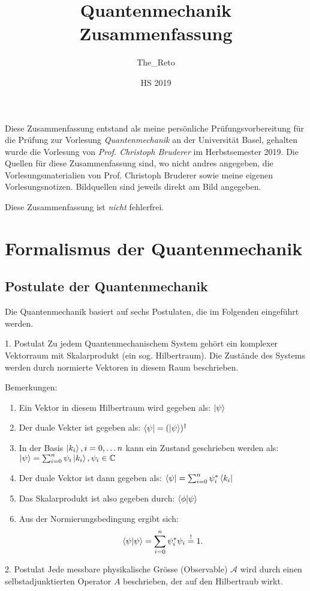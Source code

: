 \documentclass{report}
\title{ Quantenmechanik \\
        \large Zusammenfassung
        }
\author{The\_Reto}
\date{HS 2019}
\begin{document}
    \maketitle
    Diese Zusammenfassung entstand als meine persönliche Prüfungsvorbereitung für die Prüfung zur Vorlesung \emph{Quantenmechanik} an der Universität Basel, gehalten wurde die Vorlesung von \emph{Prof. Christoph Bruderer} im Herbstsemester 2019. Die Quellen für diese Zusammenfassung sind, wo nicht andres angegeben, die Vorlesungsmaterialien von Prof. Christoph Bruderer sowie meine eigenen Vorlesungsnotizen. Bildquellen sind jeweils direkt am Bild angegeben.

Diese Zusammenfassung ist \emph{nicht} fehlerfrei.

\tableofcontents
\newpage
\chapter{Formalismus der Quantenmechanik}
\section{Postulate der Quantenmechanik}
Die Quantenmechanik basiert auf sechs Postulaten, die im Folgenden eingeführt werden.
\begin{greenbox}{1. Postulat}
	Zu jedem Quantenmechanischem System gehört ein komplexer Vektorraum mit Skalarprodukt (ein sog. Hilbertraum). Die Zustände des Systems werden durch normierte Vektoren in diesem Raum beschrieben.
\end{greenbox}

Bemerkungen:
\begin{enumerate}
	\item Ein Vektor in diesem Hilbertraum wird gegeben als: $\ket{\psi}$
	\item Der duale Vekter ist gegeben als: $\bra{\psi} = (\ket{\psi})^\dagger$
	\item In der Basis  ${\ket{k_i}, i = 0, \ldots n}$ kann ein Zustand geschrieben werden als: $\ket{\psi} = \sum_{i=0}^{n} \psi_i \ket{k_i}, \psi_i \in \mathbb{C}$
	\item Der duale Vektor ist dann gegeben als: $\bra{\psi} = \sum_{i=0}^{n} \psi_i^* \bra{k_i}$
	\item Das Skalarprodukt ist also gegeben durch: $\braket{\phi}{\psi}$
	\item Aus der Normierungsbedingung ergibt sich:  \[
			\braket{\psi}{\psi}=\sum_{i=0}^{n} \psi_i^* \psi_i\overset{!}{=}1
	.\] 
\end{enumerate}
\begin{greenbox}{2. Postulat}
	Jede messbare physikalische Grösse (Observable) $\mathcal{A}$ wird durch einen selbstadjunktierten Operator $A$ beschrieben, der auf den Hilbertraub wirkt.
\end{greenbox}
\end{document}
